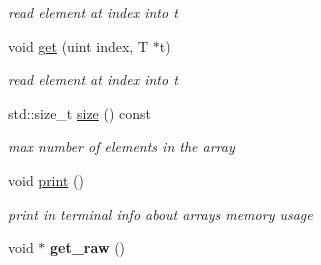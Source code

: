 \begin{DoxyCompactItemize}
\begin{DoxyCompactList}\small\item\em read element at index into t \end{DoxyCompactList}\item 
void \hyperlink{classshared__memory_1_1array_ad700d5874d92def07f77f4da7f31f980}{get} (uint index, T $\ast$t)\hypertarget{classshared__memory_1_1array_ad700d5874d92def07f77f4da7f31f980}{}\label{classshared__memory_1_1array_ad700d5874d92def07f77f4da7f31f980}

\begin{DoxyCompactList}\small\item\em read element at index into t \end{DoxyCompactList}\item 
std\+::size\+\_\+t \hyperlink{classshared__memory_1_1array_afc0dd0c59873934b082e524adb6bf2d7}{size} () const \hypertarget{classshared__memory_1_1array_afc0dd0c59873934b082e524adb6bf2d7}{}\label{classshared__memory_1_1array_afc0dd0c59873934b082e524adb6bf2d7}

\begin{DoxyCompactList}\small\item\em max number of elements in the array \end{DoxyCompactList}\item 
void \hyperlink{classshared__memory_1_1array_a9e912e143886359921c04fdbba7f6cba}{print} ()\hypertarget{classshared__memory_1_1array_a9e912e143886359921c04fdbba7f6cba}{}\label{classshared__memory_1_1array_a9e912e143886359921c04fdbba7f6cba}

\begin{DoxyCompactList}\small\item\em print in terminal info about array\textquotesingle{}s memory usage \end{DoxyCompactList}\item 
void $\ast$ {\bfseries get\+\_\+raw} ()\hypertarget{classshared__memory_1_1array_a20e27fb6b9a18e252368c4f6118b3d27}{}\label{classshared__memory_1_1array_a20e27fb6b9a18e252368c4f6118b3d27}

\end{DoxyCompactItemize}
